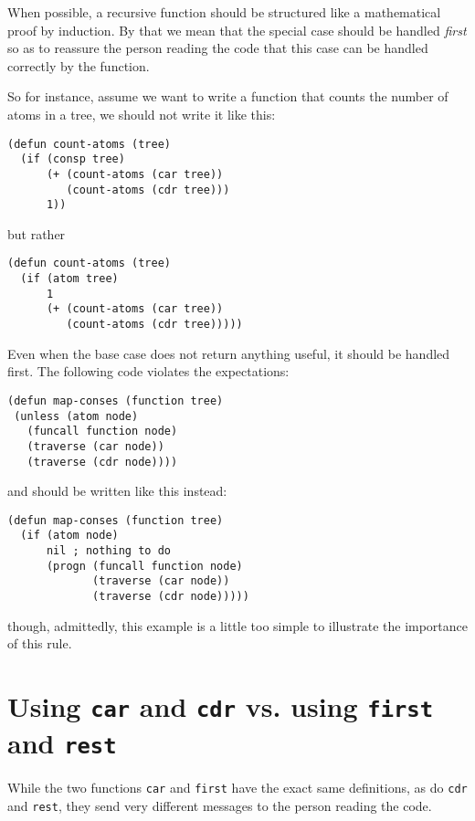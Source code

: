 When possible, a recursive function should be structured like a
mathematical proof by induction.  By that we mean that the special
case should be handled \emph{first} so as to reassure the person
reading the code that this case can be handled correctly by the
function.


So for instance, assume we want to write a function that counts
the number of atoms in a tree, we should not write it like this:

\begin{verbatim}
(defun count-atoms (tree)
  (if (consp tree)
      (+ (count-atoms (car tree))
         (count-atoms (cdr tree)))
      1))
\end{verbatim}

but rather

\begin{verbatim}
(defun count-atoms (tree)
  (if (atom tree)
      1
      (+ (count-atoms (car tree))
         (count-atoms (cdr tree)))))
\end{verbatim}

Even when the base case does not return anything useful, it should be
handled first.  The following code violates the expectations:

\begin{verbatim}
(defun map-conses (function tree)
 (unless (atom node)
   (funcall function node)
   (traverse (car node))
   (traverse (cdr node))))
\end{verbatim}

and should be written like this instead:

\begin{verbatim}
(defun map-conses (function tree)
  (if (atom node)
      nil ; nothing to do
      (progn (funcall function node)
             (traverse (car node))
             (traverse (cdr node)))))
\end{verbatim}

though, admittedly, this example is a little too simple to illustrate
the importance of this rule.

\section{Using \texttt{car} and \texttt{cdr} vs. using \texttt{first}
  and \texttt{rest}}

While the two functions \texttt{car} and \texttt{first} have the exact
same definitions, as do \texttt{cdr} and \texttt{rest}, they send very
different messages to the person reading the code.

